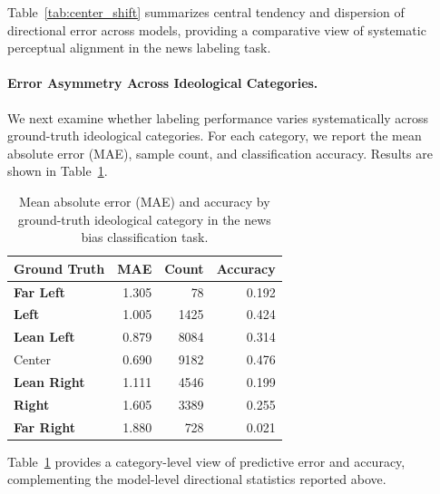 \documentclass[11pt]{article}
\begin{document}
Table~\ref{tab:center_shift} summarizes central tendency and dispersion of directional error across models, providing a comparative view of systematic perceptual alignment in the news labeling task.

\paragraph{Error Asymmetry Across Ideological Categories.}
We next examine whether labeling performance varies systematically across ground-truth ideological categories. For each category, we report the mean absolute error (MAE), sample count, and classification accuracy. Results are shown in Table~\ref{tab:blindspot_analysis}.

\begin{table}[h]
\centering
\small
\setlength{\tabcolsep}{4pt}
\begin{tabular}{l r r r}
\toprule
\textbf{Ground Truth} & \textbf{MAE} & \textbf{Count} & \textbf{Accuracy} \\
\midrule
\textcolor{blue!100}{\textbf{Far Left}}   & 1.305 & 78   & 0.192 \\
\textcolor{blue!75}{\textbf{Left}}        & 1.005 & 1425 & 0.424 \\
\textcolor{blue!50}{\textbf{Lean Left}}   & 0.879 & 8084 & 0.314 \\
Center                                    & 0.690 & 9182 & 0.476 \\
\textcolor{red!50}{\textbf{Lean Right}}   & 1.111 & 4546 & 0.199 \\
\textcolor{red!75}{\textbf{Right}}        & 1.605 & 3389 & 0.255 \\
\textcolor{red!100}{\textbf{Far Right}}   & 1.880 & 728  & 0.021 \\
\bottomrule
\end{tabular}
\caption{Mean absolute error (MAE) and accuracy by ground-truth ideological category in the news bias classification task.}
\vspace{-2mm}
\label{tab:blindspot_analysis}
\end{table}

Table~\ref{tab:blindspot_analysis} provides a category-level view of predictive error and accuracy, complementing the model-level directional statistics reported above.



\end{document}
